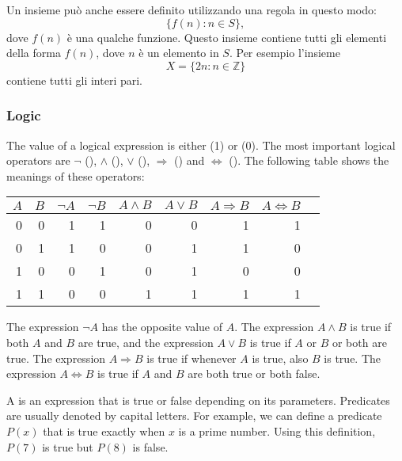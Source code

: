 Un insieme può anche essere definito utilizzando una regola in questo modo: 
\[\{f(n) : n \in S\},\]
dove $f(n)$ è una qualche funzione.
Questo insieme contiene tutti gli elementi della forma $f(n)$,
dove $n$ è un elemento in $S$.
Per esempio l'insieme
\[X=\{2n : n \in \mathbb{Z}\}\]
contiene tutti gli interi pari.

\subsubsection{Logic}


The value of a logical expression is either
 (1) or  (0).
The most important logical operators are
$\lnot$ (),
$\land$ (),
$\lor$ (),
$\Rightarrow$ () and
$\Leftrightarrow$ ().
The following table shows the meanings of these operators:

\begin{center}
\begin{tabular}{rr|rrrrrrr}
$A$ & $B$ & $\lnot A$ & $\lnot B$ & $A \land B$ & $A \lor B$ & $A \Rightarrow B$ & $A \Leftrightarrow B$ \\
\hline
0 & 0 & 1 & 1 & 0 & 0 & 1 & 1 \\
0 & 1 & 1 & 0 & 0 & 1 & 1 & 0 \\
1 & 0 & 0 & 1 & 0 & 1 & 0 & 0 \\
1 & 1 & 0 & 0 & 1 & 1 & 1 & 1 \\
\end{tabular}
\end{center}

The expression $\lnot A$ has the opposite value of $A$.
The expression $A \land B$ is true if both $A$ and $B$
are true,
and the expression $A \lor B$ is true if $A$ or $B$ or both
are true.
The expression $A \Rightarrow B$ is true
if whenever $A$ is true, also $B$ is true.
The expression $A \Leftrightarrow B$ is true
if $A$ and $B$ are both true or both false.


A  is an expression that is true or false
depending on its parameters.
Predicates are usually denoted by capital letters.
For example, we can define a predicate $P(x)$
that is true exactly when $x$ is a prime number.
Using this definition, $P(7)$ is true but $P(8)$ is false.

